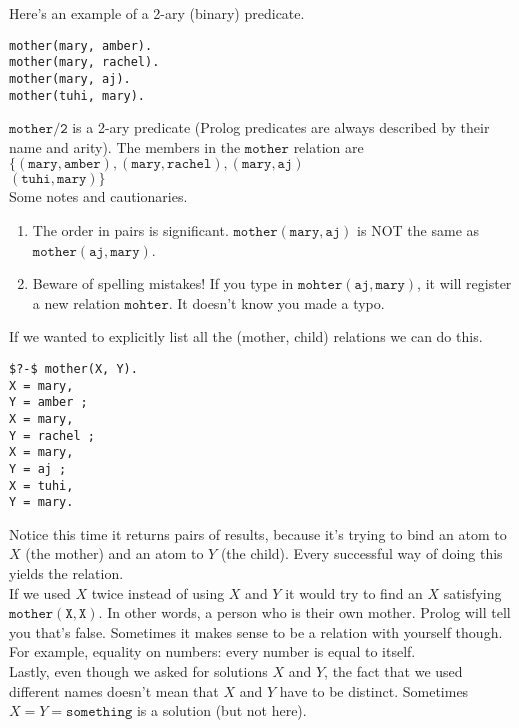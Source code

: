 \documentclass[a4paper,12pt]{article}
\newcommand{\kwa}[1]{\mathtt{#1}}
\begin{document}
\noindent
Here's an example of a 2-ary (binary) predicate.

\begin{lstlisting}
mother(mary, amber).
mother(mary, rachel).
mother(mary, aj).
mother(tuhi, mary).
\end{lstlisting}

\noindent
$\kwa{mother \slash 2}$ is a 2-ary predicate (Prolog predicates are always described by their name and arity). The members in the $\kwa{mother}$ relation are
$\kwa{ \{(mary, amber), (mary, rachel), (mary, aj) }$\\$\kwa{ (tuhi, mary) \} }$ \\

\noindent
Some notes and cautionaries.
\begin{enumerate}
	\item The order in pairs is significant. $\kwa{mother(mary, aj)}$ is NOT the same as $\kwa{mother(aj, mary)}$.
	\item Beware of spelling mistakes! If you type in $\kwa{mohter(aj, mary)}$, it will register a new relation $\kwa{mohter}$. It doesn't know you made a typo.
\end{enumerate}

\noindent
If we wanted to explicitly list all the (mother, child) relations we can do this.

\begin{lstlisting}
$?-$ mother(X, Y).
X = mary,
Y = amber ;
X = mary,
Y = rachel ;
X = mary,
Y = aj ;
X = tuhi,
Y = mary.
\end{lstlisting}

\noindent
Notice this time it returns pairs of results, because it's trying to bind an atom to $X$ (the mother) and an atom to $Y$ (the child). Every successful way of doing this yields the relation. \\

\noindent
If we used $X$ twice instead of using $X$ and $Y$ it would try to find an $X$ satisfying $\kwa{mother(X,X)}$. In other words, a person who is their own mother. Prolog will tell you that's false. Sometimes it makes sense to be a relation with yourself though. For example, equality on numbers: every number is equal to itself. \\

\noindent
Lastly, even though we asked for solutions $X$ and $Y$, the fact that we used different names doesn't mean that $X$ and $Y$ have to be distinct. Sometimes $X = Y = \kwa{something}$ is a solution (but not here).\\
\end{document}
